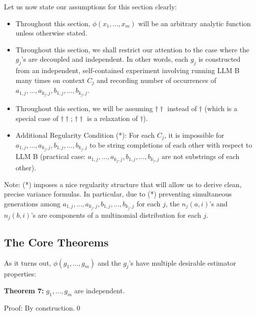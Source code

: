 \documentclass{article}
\begin{document}
Let us now state our assumptions for this section clearly:
\begin{mdframed}
\begin{itemize}
    \item Throughout this section, $\phi(x_1, \dots, x_m)$ will be an arbitrary analytic function unless otherwise stated.
    \item Throughout this section, we shall restrict our attention to the case where the $g_j$'s are decoupled and independent. In other words, each $g_j$ is constructed from an independent, self-contained experiment involving running LLM B many times on context $C_j$ and recording number of occurrences of $a_{1,j}, \dots, a_{k_j,j}, b_{1,j}, \dots, b_{k_j,j}$.
    \item Throughout this section, we will be assuming $\dagger\dagger$ instead of $\dagger$ (which is a special case of $\dagger\dagger$; $\dagger\dagger$ is a relaxation of $\dagger$).
    \item Additional Regularity Condition (*): For each $C_j$, it is impossible for $a_{1,j}, \dots, a_{k_j,j}, b_{1,j}, \dots, b_{k_j,j}$ to be string completions of each other with respect to LLM B (practical case: $a_{1,j}, \dots, a_{k_j,j}, b_{1,j}, \dots, b_{k_j,j}$ are not substrings of each other).
\end{itemize}
\end{mdframed}
Note: (*) imposes a nice regularity structure that will allow us to derive clean, precise variance formulas. In particular, due to (*) preventing simultaneous generations among $\displaystyle a_{1,j} ,...,a_{k_{j} ,j} ,b_{1,j} ,...,b_{k_{j} ,j}$ for each $\displaystyle j$, the $\displaystyle n_{j}\left( a,i\right)$'s and $\displaystyle n_{j}\left( b,i\right)$'s are components of a multinomial distribution for each $\displaystyle j$.



\subsection{The Core Theorems}

As it turns out, $\displaystyle \phi \left( g_{1} ,...,g_{m}\right)$ and the $\displaystyle g_{j}$'s have multiple desirable estimator properties:



\textbf{Theorem 7:} $\displaystyle g_{1} ,...,g_{m}$ are independent.



Proof: By construction.\qed 
\end{document}
